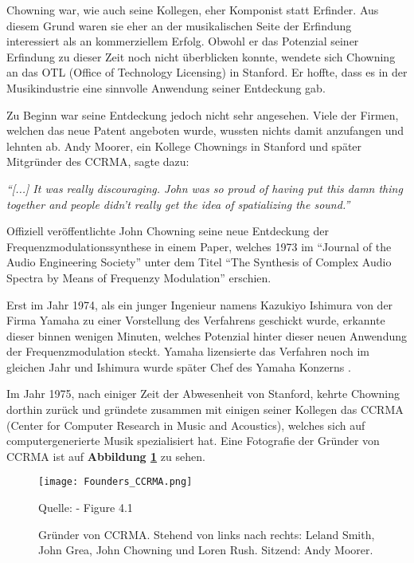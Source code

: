 Chowning war, wie auch seine Kollegen, eher Komponist statt Erfinder. Aus diesem Grund waren sie eher an der musikalischen Seite der Erfindung interessiert als an kommerziellem Erfolg. Obwohl er das Potenzial seiner Erfindung zu dieser Zeit noch nicht überblicken konnte, wendete sich Chowning an das OTL (Office of Technology Licensing) in Stanford. Er hoffte, dass es in der Musikindustrie eine sinnvolle Anwendung seiner Entdeckung gab.\cite[S. 42]{soundofinnovation}

 Zu Beginn war seine Entdeckung jedoch nicht sehr angesehen. Viele der Firmen, welchen das neue Patent angeboten wurde, wussten nichts damit anzufangen und lehnten ab. Andy Moorer, ein Kollege Chownings in Stanford und später Mitgründer des CCRMA, sagte dazu: 

\textit{``[...] It was really discouraging. John was so proud of having put this damn thing together and people didn't really get the idea of spatializing the sound.''}\cite[S. 43]{soundofinnovation}

Offiziell veröffentlichte John Chowning seine neue Entdeckung der Frequenzmodulationssynthese in einem Paper, welches 1973 im ``Journal of the Audio Engineering Society'' unter dem Titel ``The Synthesis of Complex Audio Spectra by Means of Frequenzy Modulation'' erschien.

Erst im Jahr 1974, als ein junger Ingenieur namens Kazukiyo Ishimura von der Firma Yamaha zu einer Vorstellung des Verfahrens geschickt wurde, erkannte dieser binnen wenigen Minuten, welches Potenzial hinter dieser neuen Anwendung der Frequenzmodulation steckt. Yamaha lizensierte das Verfahren noch im gleichen Jahr und Ishimura wurde später Chef des Yamaha Konzerns \cite{fatherofdigitalmusik}.

Im Jahr 1975, nach einiger Zeit der Abwesenheit von Stanford, kehrte Chowning dorthin zurück und gründete zusammen mit einigen seiner Kollegen das CCRMA (Center for Computer Research in Music and Acoustics), welches sich auf computergenerierte Musik spezialisiert hat.
Eine Fotografie der Gründer von CCRMA ist auf \textbf{Abbildung \ref{fig:foundersCCRMA}} zu sehen.

\begin{figure} [ht]
\centering
  \texttt{[image: Founders\_CCRMA.png]}
\caption{Gründer von CCRMA. Stehend von links nach rechts: Leland Smith, John Grea, John Chowning und Loren Rush. Sitzend: Andy Moorer.}
\label{fig:foundersCCRMA}
Quelle: \cite[S. 52]{soundofinnovation} - Figure 4.1
\end{figure}

